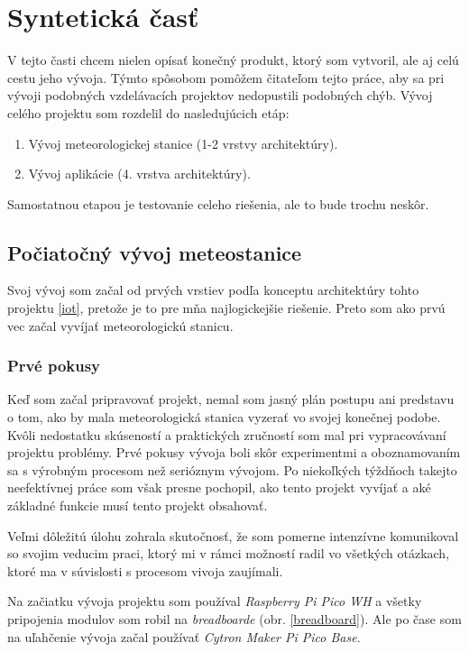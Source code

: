 \chapter{Syntetická časť}
\label{methodology}

V tejto časti chcem nielen opísať konečný produkt, ktorý som vytvoril, ale aj celú cestu jeho vývoja. Týmto spôsobom pomôžem čitateľom tejto práce, aby sa pri vývoji podobných vzdelávacích projektov nedopustili podobných chýb.
Vývoj celého projektu som rozdelil do nasledujúcich etáp: 
\begin{enumerate}
    \item Vývoj meteorologickej stanice (1-2 vrstvy architektúry).
    \item Vývoj aplikácie (4. vrstva architektúry).
\end{enumerate}
Samostatnou etapou je testovanie celeho riešenia, ale to bude trochu neskôr.
\section{Počiatočný vývoj meteostanice}
Svoj vývoj som začal od prvých vrstiev podľa konceptu architektúry tohto projektu \ref{iot}, pretože je to pre mňa najlogickejšie riešenie. Preto som ako prvú vec začal vyvíjať meteorologickú stanicu.
\subsection{Prvé pokusy}
Keď som začal pripravovať projekt, nemal som jasný plán postupu ani predstavu o tom, ako by mala meteorologická stanica vyzerať vo svojej konečnej podobe. Kvôli nedostatku skúseností a praktických zručností som mal pri vypracovávaní projektu problémy. Prvé pokusy vývoja boli skôr experimentmi a oboznamovaním sa s výrobným procesom než serióznym vývojom. Po niekoľkých týždňoch takejto neefektívnej práce som však presne pochopil, ako tento projekt vyvíjať a aké základné funkcie musí tento projekt obsahovať. 

Veľmi dôležitú úlohu zohrala skutočnosť, že som pomerne intenzívne komunikoval so svojim veducim praci, ktorý mi v rámci možností radil vo všetkých otázkach, ktoré ma v súvislosti s procesom vivoja zaujímali.

Na začiatku vývoja projektu som používal \textit{Raspberry Pi Pico WH} a všetky pripojenia modulov som robil na \textit{breadboarde} (obr. \ref{breadboard}). Ale po čase som na uľahčenie vývoja začal používať \textit{Cytron Maker Pi Pico Base}.

